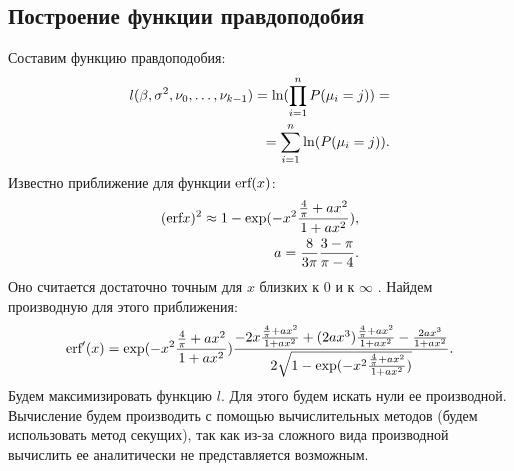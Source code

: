 \documentclass[12pt]{article}
\begin{document}
\subsection{Построение функции правдоподобия}
Составим функцию правдоподобия:
\begin{eqnarray}
    l(\beta,\sigma^2, \nu_0,\dots, \nu_{k-1})=\textup{ln}(\prod_{i=1}^{n}P(\mu_i=j))=\\
    =\sum_{i=1}^{n}\ln(P(\mu_i=j)).
\end{eqnarray}
Известно приближение для функции $\textup{erf}(x)$:
\begin{eqnarray}
    (\textup{erf} x)^2\approx 1- \exp(-x^2 \frac{\frac{4}{\pi}+ax^2}{1+ax^2}),\\
    a=\frac{8}{3\pi}\frac{3-\pi}{\pi -4}.
\end{eqnarray}
Оно считается достаточно точным для $x$ близких к $0$ и к $\infty$ \cite{Winitzki}. \hfill\break
Найдем производную для этого приближения:
\begin{eqnarray}
    \textup{erf}'(x) = \exp(-x^2 \frac{\frac{4}{\pi}+ax^2}{1+ax^2}) \frac{-2x\frac{\frac{4}{\pi}+ax^2}{1+ax^2}+(2ax^3)\frac{\frac{4}{\pi}+ax^2}{1+ax^2}-\frac{2ax^3}{1+ax^2}}{2\sqrt{1- \exp(-x^2 \frac{\frac{4}{\pi}+ax^2}{1+ax^2})}}.
\end{eqnarray}
Будем максимизировать функцию $l$.
Для этого будем искать нули ее производной. Вычисление будем производить с помощью вычислительных методов (будем использовать метод секущих), так как из-за сложного вида производной вычислить ее аналитически не представляется возможным.
\end{document}
